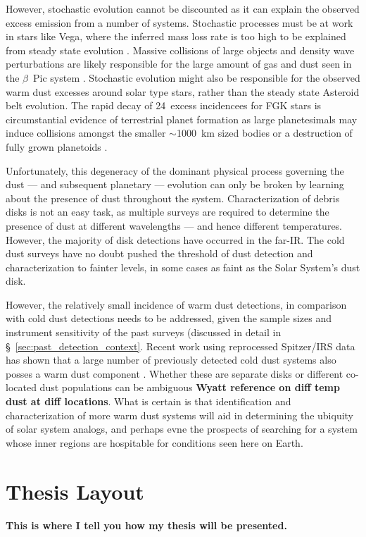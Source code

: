     However, stochastic evolution cannot be discounted as it can explain the observed excess emission from a number of systems. Stochastic processes must be at work in stars like Vega, where the inferred mass loss rate is too high to be explained from steady state evolution \citep{Su2006}. Massive collisions of large objects and density wave perturbations are likely responsible for the large amount of gas and dust seen in the $\beta$~Pic system \citep{Telesco2005, Nesvold2015}. Stochastic  evolution might also be responsible for the observed warm dust excesses around solar type stars, rather than the steady state Asteroid belt evolution. The rapid decay of 24\micron\ excess incidencees for FGK stars is circumstantial evidence of terrestrial planet formation as large planetesimals may induce collisions amongst the smaller $\sim$1000~km sized bodies or a destruction of fully grown planetoids \citep{Meyer2008, Wyatt2008}. 
    
    
    Unfortunately, this degeneracy of the dominant physical process governing the dust --- and subsequent planetary --- evolution can only be broken by learning about the presence of dust throughout the system. Characterization of debris disks is not an easy task, as multiple surveys are required to determine the presence of dust at different wavelengths --- and hence different temperatures. However, the majority of disk detections have occurred in the far-IR. The cold dust surveys have no doubt pushed the threshold of dust detection and characterization to fainter levels, in some cases as faint as the Solar System's dust disk.%
    
    However, the relatively small incidence of warm dust detections, in comparison with cold dust detections needs to be addressed, given the sample sizes and instrument sensitivity of the past surveys (discussed in detail in \S~\ref{sec:past_detection_context}. Recent work using reprocessed Spitzer/IRS data has shown that a large number of previously detected cold dust systems also posses a warm dust component \citep{Chen2014}. Whether these are separate disks or different co-located dust populations can be ambiguous \textbf{Wyatt reference on diff temp dust at diff locations}. What is certain is that identification and characterization of more warm dust systems will aid in determining the ubiquity of solar system analogs, and perhaps evne the prospects of searching for a system whose inner regions are hospitable for conditions seen here on Earth. 
    
    
\section{Thesis Layout}
    
    \textbf{This is where I tell you how my thesis will be presented.}
    

    